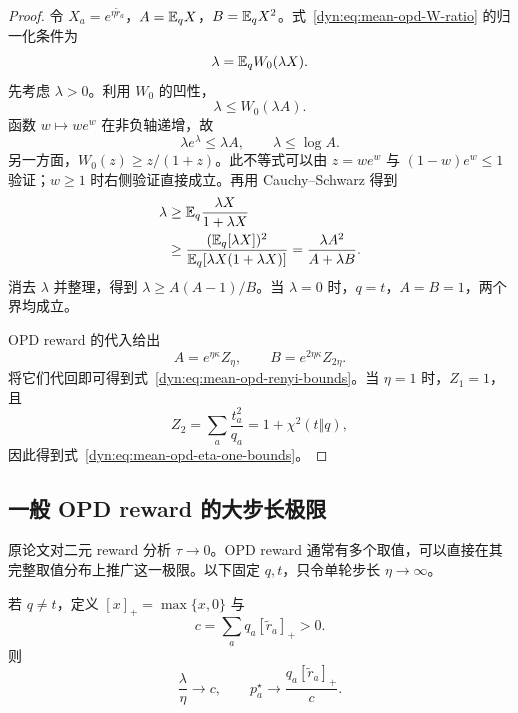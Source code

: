 \begin{proof}
令 $X_a=e^{\eta \widetilde r_a}$，$A=\mathbb E_qX$，$B=\mathbb E_qX^2$。式~\eqref{dyn:eq:mean-opd-W-ratio} 的归一化条件为
\begin{equation*}
 \lambda=\mathbb E_qW_0(\lambda X).
\end{equation*}
先考虑 $\lambda>0$。利用 $W_0$ 的凹性，
\begin{equation*}
 \lambda\le W_0(\lambda A).
\end{equation*}
函数 $w\mapsto we^w$ 在非负轴递增，故
\begin{equation*}
 \lambda e^\lambda\le\lambda A,
 \qquad \lambda\le\log A.
\end{equation*}
另一方面，$W_0(z)\ge z/(1+z)$。此不等式可以由 $z=we^w$ 与 $(1-w)e^w\le1$ 验证；$w\ge1$ 时右侧验证直接成立。再用 Cauchy--Schwarz 得到
\begin{align*}
 \lambda
 &\ge\mathbb E_q\frac{\lambda X}{1+\lambda X}\\
 &\ge\frac{(\mathbb E_q[\lambda X])^2}
            {\mathbb E_q[\lambda X(1+\lambda X)]}
 =\frac{\lambda A^2}{A+\lambda B}.
\end{align*}
消去 $\lambda$ 并整理，得到 $\lambda\ge A(A-1)/B$。当 $\lambda=0$ 时，$q=t$，$A=B=1$，两个界均成立。

OPD reward 的代入给出
\begin{equation*}
 A=e^{\eta\kappa}Z_\eta,
 \qquad B=e^{2\eta\kappa}Z_{2\eta}.
\end{equation*}
将它们代回即可得到式~\eqref{dyn:eq:mean-opd-renyi-bounds}。当 $\eta=1$ 时，$Z_1=1$，且
\begin{equation*}
 Z_2=\sum_a\frac{t_a^2}{q_a}=1+\chi^2(t\Vert q),
\end{equation*}
因此得到式~\eqref{dyn:eq:mean-opd-eta-one-bounds}。
\end{proof}

\subsection{一般 OPD reward 的大步长极限}

原论文对二元 reward 分析 $\tau\to0$。OPD reward 通常有多个取值，可以直接在其完整取值分布上推广这一极限。以下固定 $q,t$，只令单轮步长 $\eta\to\infty$。

\begin{proposition}
\label{dyn:prop:mean-opd-large-eta}
若 $q\ne t$，定义 $[x]_+=\max\{x,0\}$ 与
\begin{equation*}
 c=\sum_aq_a[\widetilde r_a]_+>0.
\end{equation*}
则
\begin{equation}
 \frac{\lambda}{\eta}\longrightarrow c,
 \qquad
 p_a^\star\longrightarrow\frac{q_a[\widetilde r_a]_+}{c}.
 \label{dyn:eq:mean-opd-large-eta}
\end{equation}
\end{proposition}


